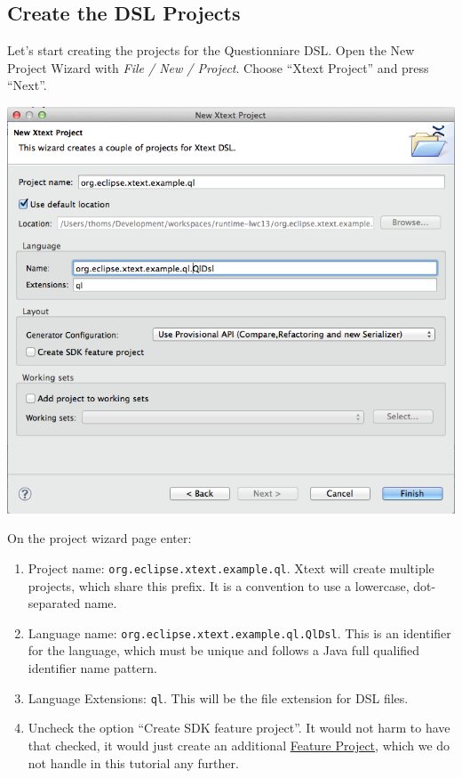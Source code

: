 \subsection{Create the DSL Projects}

Let's start creating the projects for the Questionniare DSL. Open the New
Project Wizard with \emph{File / New / Project}. Choose ``Xtext Project'' and press
``Next''.

\includegraphics[width=17cm]{./images/chapter01/NewXtextProjectWizard.png}

On the project wizard page enter:
\begin{enumerate}
  \item Project name: \texttt{org.eclipse.xtext.example.ql}. Xtext will create
  multiple projects, which share this prefix. It is a convention to use
  a lowercase, dot-separated name.
  \item Language name: \texttt{org.eclipse.xtext.example.ql.QlDsl}. This is an
  identifier for the language, which must be unique and follows a Java
  full qualified identifier name pattern.
  \item Language Extensions: \texttt{ql}. This will be the file extension for
  DSL files.
  \item Uncheck the option ``Create SDK feature project''. It would not harm to
  have that checked, it would just create an additional
  \href{http://www.vogella.com/articles/EclipseFeatureProject/article.html}{Feature
  Project}, which we do not handle in this tutorial any further.
\end{enumerate}

